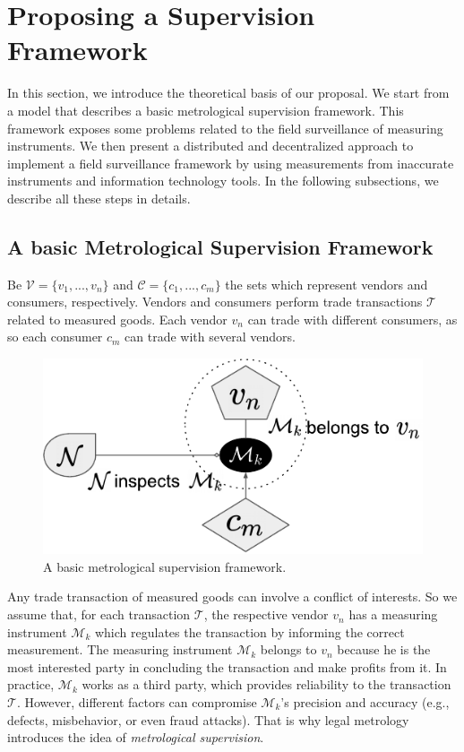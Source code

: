 \documentclass[sigplan]{acmart}
\begin{document}
\section{Proposing a Supervision Framework}
In this section, we introduce the theoretical basis of our proposal.
We start from a model that describes a basic metrological supervision framework.
This framework exposes some problems related to the field surveillance of measuring instruments.
We then present a distributed and decentralized approach to implement a field surveillance framework by using measurements from inaccurate instruments and information technology tools.
In the following subsections, we describe all these steps in details.

\subsection{A basic Metrological Supervision Framework}
Be $\mathcal{V}=\{v_1, ..., v_n\}$ and $\mathcal{C}=\{c_1, ..., c_m\}$ the sets which represent vendors and consumers, respectively.
Vendors and consumers perform trade transactions $\mathcal{T}$ related to measured goods.
Each vendor $v_n$ can trade with different consumers, as so each consumer $c_m$ can trade with several vendors.

\begin{figure}[!t]
\centering
\includegraphics[width=.4\textwidth]{basicframe1}
\caption{A basic metrological supervision framework.}
\label{f:basicframe1}
\end{figure}

Any trade transaction of measured goods can involve a conflict of interests.
So we assume that, for each transaction $\mathcal{T}$, the respective vendor $v_n$ has a measuring instrument $\mathcal{M}_k$ which regulates the transaction by informing the correct measurement.
The measuring instrument $\mathcal{M}_k$ belongs to $v_n$ because he is the most interested party in concluding the transaction and make profits from it.
In practice, $\mathcal{M}_k$ works as a third party, which provides reliability to the transaction $\mathcal{T}$.
However, different factors can compromise $\mathcal{M}_k$'s precision and accuracy (e.g., defects, misbehavior, or even fraud attacks).
That is why legal metrology introduces the idea of \emph{metrological supervision}.
\end{document}
